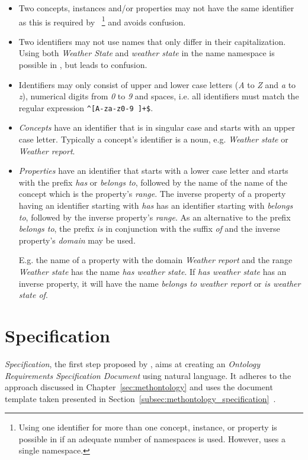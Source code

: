 \begin{itemize}
  \item Two concepts, instances and/or properties may not have the same identifier as this is required by ~\cite{OWL}\footnote{Using one identifier for more than one concept, instance, or property is possible in  if an adequate number of namespaces is used. However, \smarthomeweather uses a single namespace.} and avoids confusion.
  \item Two identifiers may not use names that only differ in their capitalization. Using both \emph{Weather State} and \emph{weather state} in the name namespace is possible in , but leads to confusion.
  \item Identifiers may only consist of upper and lower case  letters (\emph{A} to \emph{Z} and \emph{a} to \emph{z}), numerical digits from \emph{0} to \emph{9} and spaces, i.e. all identifiers must match the regular expression \texttt{\textasciicircum[A-za-z0-9~]+\$}.
  \item \emph{Concepts} have an identifier that is in singular case and starts with an upper case letter. Typically a concept's identifier is a noun, e.g. \emph{Weather state} or \emph{Weather report}.
  \item \emph{Properties} have an identifier that starts with a lower case letter and starts with the prefix \emph{has} or \emph{belongs to}, followed by the name of the name of the concept which is the property's \emph{range}. The inverse property of a property having an identifier starting with \emph{has} has an identifier starting with \emph{belongs to}, followed by the inverse property's \emph{range}. As an alternative to the prefix \emph{belongs to}, the prefix \emph{is} in conjunction with the suffix \emph{of} and the inverse property's \emph{domain} may be used.
  
  E.g. the name of a property with the domain \emph{Weather report} and the range \emph{Weather state} has the name \emph{has weather state}. If \emph{has weather state} has an inverse property, it will have the name \emph{belongs to weather report} or \emph{is weather state of}.
\end{itemize}


\section{Specification}
\label{sec:ontology_specification}

\emph{Specification}, the first step proposed by \methontology, aims at creating an \emph{Ontology Requirements Specification Document} using natural language. It adheres to the approach discussed in Chapter~\ref{sec:methontology} and uses the document template taken presented in Section~\ref{subsec:methontology_specification}~\cite{ORSD}.

